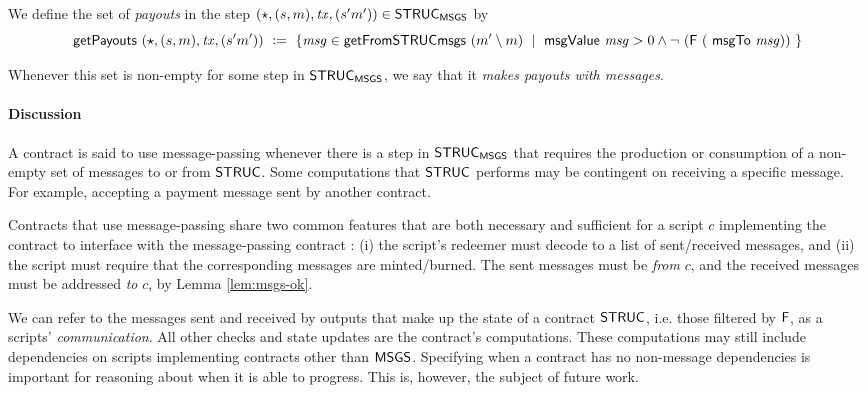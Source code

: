 We define the set of \emph{payouts} in the step $(\star, (s, m), \mathit{tx}, (s' m')) \in \mathsf{STRUC}_{\mathsf{MSGS}}$ by
\[\mathsf{getPayouts}~(\star, (s, m), \mathit{tx}, (s' m'))~\mathrel{\mathop:}=~\{ \mathit{msg} \in \mathsf{getFromSTRUCmsgs}~(m' \setminus m) ~\mid ~\mathsf{msgValue}~\mathit{msg} > 0 \wedge
\neg~(\mathsf{F}~(~\mathsf{msgTo}~\mathit{msg})) ~\} \]

Whenever this set is non-empty for some step in $\mathsf{STRUC}_{\mathsf{MSGS}}$, we say that it
\emph{makes payouts with messages}.

\paragraph{Discussion}

A contract is said to use message-passing whenever there is a step in $\mathsf{STRUC}_{\mathsf{MSGS}}$ that
requires the production or consumption of a non-empty set of messages to or from $\mathsf{STRUC}$.
Some computations that $\mathsf{STRUC}$ performs may be contingent on receiving a specific
message. For example, accepting a payment message sent by another contract.

Contracts that use message-passing share two common features that are both necessary
and sufficient for a script $c$ implementing the contract to interface with the message-passing contract :
(i) the script's redeemer must decode to a list of sent/received messages, and (ii)
the script must require that the corresponding messages are minted/burned.
The sent messages must be \emph{from} $c$, and the received messages must be
addressed \emph{to} $c$, by Lemma \ref{lem:msgs-ok}.

We can refer to the messages sent and received by outputs that make up the state
of a contract $\mathsf{STRUC}$, i.e. those filtered by $\mathsf{F}$, as a scripts'
\emph{communication}. All other checks and state updates are the contract's
computations. These computations may still include dependencies on scripts implementing
contracts other than $\mathsf{MSGS}$. Specifying when a contract has no non-message
dependencies is important for reasoning about when it is able to progress.
This is, however, the subject of future work.

